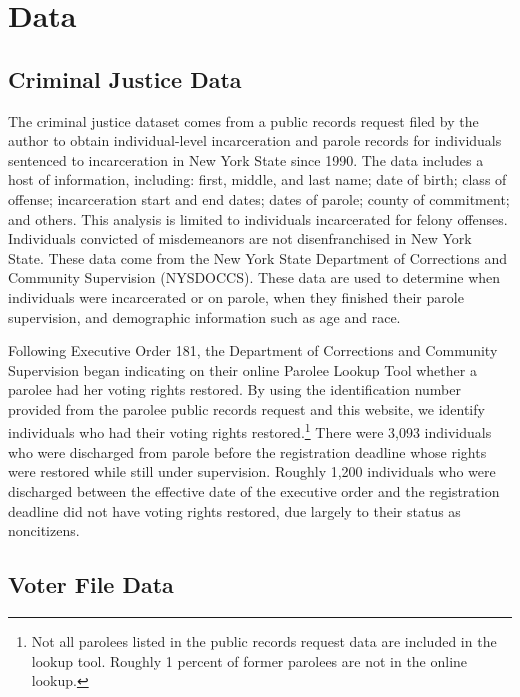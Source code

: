\documentclass[
  12pt,
]{article}
\begin{document}
\hypertarget{data}{%
\section*{Data}\label{data}}

\hypertarget{criminal-justice-data}{%
\subsection*{Criminal Justice Data}\label{criminal-justice-data}}

The criminal justice dataset comes from a public records request filed by the author to obtain individual-level incarceration and parole records for individuals sentenced to incarceration in New York State since 1990. The data includes a host of information, including: first, middle, and last name; date of birth; class of offense; incarceration start and end dates; dates of parole; county of commitment; and others. This analysis is limited to individuals incarcerated for felony offenses. Individuals convicted of misdemeanors are not disenfranchised in New York State. These data come from the New York State Department of Corrections and Community Supervision (NYSDOCCS). These data are used to determine when individuals were incarcerated or on parole, when they finished their parole supervision, and demographic information such as age and race.

Following Executive Order 181, the Department of Corrections and Community Supervision began indicating on their online Parolee Lookup Tool whether a parolee had her voting rights restored. By using the identification number provided from the parolee public records request and this website, we identify individuals who had their voting rights restored.\footnote{Not all parolees listed in the public records request data are included in the lookup tool. Roughly 1 percent of former parolees are not in the online lookup.} There were 3,093 individuals who were discharged from parole before the registration deadline whose rights were restored while still under supervision. Roughly 1,200 individuals who were discharged between the effective date of the executive order and the registration deadline did not have voting rights restored, due largely to their status as noncitizens.

\hypertarget{voter-file-data}{%
\subsection*{Voter File Data}\label{voter-file-data}}
\end{document}
